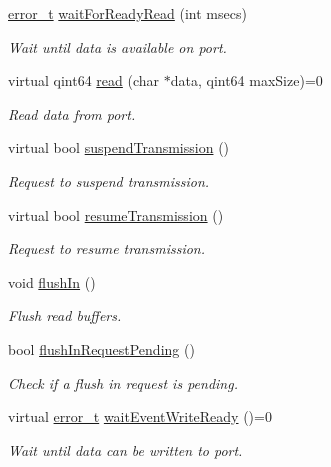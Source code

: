 \begin{DoxyCompactItemize}
\hyperlink{classmdt_abstract_port_ad4121bb930c95887e77f8bafa065a85e}{error\_\-t} \hyperlink{classmdt_abstract_port_a47f4db2e72b5fd3e32162e6a898fd391}{waitForReadyRead} (int msecs)
\begin{DoxyCompactList}\small\item\em Wait until data is available on port. \end{DoxyCompactList}\item 
virtual qint64 \hyperlink{classmdt_abstract_port_a9d9c45220d5328c9856a2445557fe970}{read} (char $\ast$data, qint64 maxSize)=0
\begin{DoxyCompactList}\small\item\em Read data from port. \end{DoxyCompactList}\item 
virtual bool \hyperlink{classmdt_abstract_port_aff3d79248baf96e670eba6d2fef700b9}{suspendTransmission} ()
\begin{DoxyCompactList}\small\item\em Request to suspend transmission. \end{DoxyCompactList}\item 
virtual bool \hyperlink{classmdt_abstract_port_ad4a04c995df881593db0a309000be7a7}{resumeTransmission} ()
\begin{DoxyCompactList}\small\item\em Request to resume transmission. \end{DoxyCompactList}\item 
void \hyperlink{classmdt_abstract_port_a32329b4188db796401e4f454755acb44}{flushIn} ()
\begin{DoxyCompactList}\small\item\em Flush read buffers. \end{DoxyCompactList}\item 
bool \hyperlink{classmdt_abstract_port_a54b7bfb725c91b2c292a39275b877207}{flushInRequestPending} ()
\begin{DoxyCompactList}\small\item\em Check if a flush in request is pending. \end{DoxyCompactList}\item 
virtual \hyperlink{classmdt_abstract_port_ad4121bb930c95887e77f8bafa065a85e}{error\_\-t} \hyperlink{classmdt_abstract_port_a35e4686f50e2c53c7e3618cf2c485d92}{waitEventWriteReady} ()=0
\begin{DoxyCompactList}\small\item\em Wait until data can be written to port. \end{DoxyCompactList}\item 

\end{DoxyCompactItemize}
